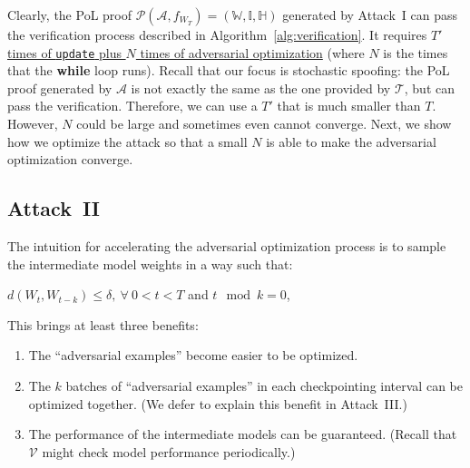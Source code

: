 \documentclass[conference]{IEEEtran}
\newcommand{\Prov}{\mathcal{T}\xspace}
\newcommand{\Verif}{\mathcal{V}\xspace}
\newcommand{\Adv}{\mathcal{A}\xspace}
\newcommand{\Proof}{\mathcal{P}\xspace}
\newcommand{\WWW}{\mathbb{W}\xspace}
\newcommand{\III}{\mathbb{I}\xspace}
\newcommand{\HHH}{\mathbb{H}\xspace}
\begin{document}
Clearly, the PoL proof $\Proof(\Adv, f_{W_T})=(\WWW, \III, \HHH)$ generated by Attack~I can pass the verification process described in Algorithm~\ref{alg:verification}.
It requires \ul{$T'$ times of \texttt{update} plus $N$ times of adversarial optimization} (where $N$ is the times that the {\bf while} loop runs).
{Recall\EndAccSupp{}} that our focus is stochastic spoofing:
the PoL proof generated by $\Adv$ is not exactly the same as the one provided by $\Prov$, but can pass the verification. 
Therefore, we can use a $T'$ that is much smaller than $T$.
However, $N$ could be large and sometimes even cannot converge.
Next, we show how we optimize the {attack\EndAccSupp{}} so that a small $N$ is able to make the adversarial optimization converge.










\subsection{Attack~II}

The intuition for accelerating the adversarial optimization process is to sample the intermediate model weights
in a way such that:
\begin{center}
    $d(W_t, W_{t-k}) \leq \delta,~\forall~0< t< T$ and $t \mod k =0$,
\end{center}
This brings at least three benefits:
\begin{enumerate}
    \item The ``adversarial examples'' become  easier to be optimized.
    \item The $k$ batches of ``adversarial examples'' in each checkpointing interval can be optimized together. (We {defer\EndAccSupp{}} to explain this benefit in Attack~III.)
    \item The performance of the intermediate models can be guaranteed. (Recall that $\Verif$ might check model performance periodically.) 
\end{enumerate}
\end{document}
